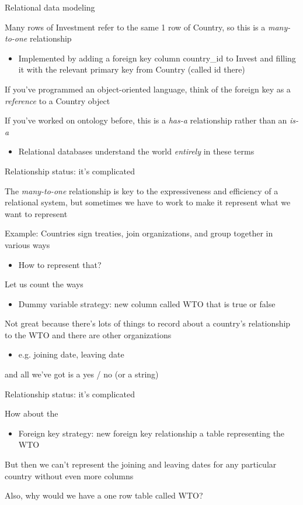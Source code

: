 \documentclass{hertieteaching}
\begin{document}
\begin{frame}{Relational data modeling}

Many rows of \textsf{Investment} refer to the same 1 row of \textsf{Country}, so this is a \textit{many-to-one} relationship
\begin{itemize}
  \item Implemented by adding a foreign key column \textsf{country\_id} to \textsf{Invest} and filling it with the relevant primary key from \textsf{Country} (called \textsf{id} there)
\end{itemize}
If you've programmed an object-oriented language, think of the foreign key as a \textit{reference} to a \textsf{Country} object

If you've worked on ontology before, this is a \textit{has-a} relationship rather than an \textit{is-a}
\begin{itemize}
  \item Relational databases understand the world \textit{entirely} in these terms
\end{itemize}


\end{frame}

\begin{frame}{Relationship status: it's complicated}
  
The \textit{many-to-one} relationship is key to the expressiveness and efficiency of a relational system, but sometimes we have to work to make it represent what we want to represent

Example: Countries sign treaties, join organizations, and group together in various ways 
\begin{itemize}
  \item How to represent that?
\end{itemize}

Let us count the ways
\begin{itemize}
  \item Dummy variable strategy: new column called WTO that is true or false
\end{itemize}
Not great because there's lots of things to record about 
a country's relationship to the WTO and there are other organizations
\begin{itemize}
  \item e.g. joining date, leaving date
\end{itemize}
and all we've got is a yes / no (or a string)

\end{frame}
\begin{frame}{Relationship status: it's complicated}

How about the
\begin{itemize}
  \item Foreign key strategy: new foreign key relationship a table representing the WTO
\end{itemize}
But then we can't represent the joining and leaving dates for any particular country without even more columns

Also, why would we have a one row table called \textsf{WTO}?

\end{frame}
\end{document}
